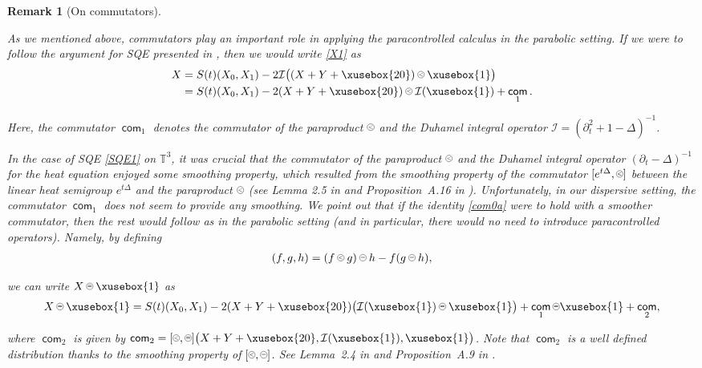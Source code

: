 \documentclass[%
11pt,  reqno]{amsart}
\def\<#1>{\xusebox{#1}}
\newcommand{\pe}{\mathbin{\scaleobj{0.7}{\tikz \draw (0,0) node[shape=circle,draw,inner sep=0pt,minimum size=8.5pt] {\scriptsize  $=$};}}}
\newcommand{\pl}{\mathbin{\scaleobj{0.7}{\tikz \draw (0,0) node[shape=circle,draw,inner sep=0pt,minimum size=8.5pt] {\scriptsize $<$};}}}
\newtheorem{remark}[theorem]{Remark}
\newcommand{\1}{\hspace{0.2mm}\text{I}\hspace{0.2mm}}
\newcommand{\noi}{\noindent}
\newcommand{\T}{\mathbb{T}}
\DeclareMathOperator{\com}{\textsf{com}}
\newcommand{\Dl}{\Delta}
\newcommand{\dt}{\partial_t}
\newcommand{\I}{\mathcal{I}}
\numberwithin{equation}{section}
\numberwithin{theorem}{section}
\begin{document}
\begin{remark}[On commutators]\label{REM:SQE}
\rm

As we mentioned above, 
commutators play an important role in applying
the paracontrolled calculus in the parabolic setting.
If we were to follow the argument for SQE presented in \cite{MW1}, 
then we would 
write \eqref{X1} as 
\begin{align}
\begin{split}
 X   & = S(t) (X_0, X_1) - 2\I \big((X  +Y+\<20>)\pl \<1>\big)\\
&   = S(t) (X_0, X_1) - 2 (X+Y+\<20>)\pl \I(\<1>)+ \com_1.
\end{split}
\label{com0a}
 \end{align}





\noi
Here, the commutator
$\com_1$ denotes
the commutator of the paraproduct $\pl$ and the Duhamel integral operator $\I = (\dt^2 + 1 - \Dl)^{-1}$.


In the case of SQE \eqref{SQE1} on $\T^3$, it was crucial that 
the commutator of the paraproduct $\pl$ and the Duhamel integral operator $ (\dt - \Dl)^{-1}$
for the heat equation
enjoyed some smoothing property,
which resulted from the smoothing property of the commutator  $[e^{t\Dl}, \pl]$ between 
 the linear heat semigroup $e^{t \Dl}$ and 
the paraproduct $\pl$
(see Lemma 2.5 in \cite{CC}
and Proposition~A.16 in \cite{MW1}).
%
Unfortunately, in our dispersive setting, 
 the commutator $\com_1$ does not seem to provide any smoothing.
We point out that 
if the identity \eqref{com0a} were to hold
with a smoother commutator, 
then the rest would follow as in the parabolic setting \cite{MW1}
(and in particular, there would no need to introduce
paracontrolled operators).
Namely,  by defining
\begin{align*}
[\pl, \pe](f, g, h) =  (f\pl g) \pe h - f (g \pe h), 
\end{align*}


\noi
we can write $ X \pe \<1>$ as 
%
\begin{align*}
 X \pe \<1> = 
 S(t) (X_0, X_1) - 2 (X+Y+\<20>) \big(\I(\<1>)\pe\<1>\big)
+ \com_1 \pe  \<1>+ \com_2 , 
 \end{align*}


\noi
where $\com_2$ is given by 
$\com_2  = [\pl, \pe]\big(X+Y+\<20>,  \I(\<1>), \<1>\big)$.
Note that $\com_2$ is a well defined distribution 
thanks to the smoothing property of  $[\pl, \pe]$.
See Lemma~2.4 in \cite{GIP}
and Proposition~A.9 in \cite{MW1}.



\end{remark}
\end{document}
